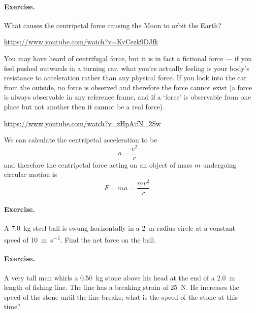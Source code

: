 \documentclass[a4paper]{amsbook}
\begin{document}
\paragraph{Exercise.} What causes the centripetal force causing the Moon to orbit the Earth?

\begin{center}
\begin{tcolorbox}[width=0.8\textwidth,colback={red},title={\textbf{Go and watch...}},colbacktitle=yellow,coltitle=blue]
  \textcolor{white}{\url{https://www.youtube.com/watch?v=KvCezk9DJfk}}
\end{tcolorbox}
\end{center}

You may have heard of centrifugal force, but it is in fact a fictional force --- if you feel pushed outwards in a turning car,
what you're actually feeling is your body's resistance to acceleration rather than any physical force. If you look into
the car from the outside, no force is observed and therefore the force cannot exist (a force is always observable in any
reference frame, and if a `force' is observable from one place but not another then it cannot be a real force).

\begin{center}
\begin{tcolorbox}[width=0.8\textwidth,colback={red},title={\textbf{Go and watch...}},colbacktitle=yellow,coltitle=blue]
  \textcolor{white}{\url{https://www.youtube.com/watch?v=zHpAifN_2Sw}}
\end{tcolorbox}
\end{center}

We can calculate the centripetal acceleration to be
\begin{equation}
  a = \frac{v^2}{r}
\end{equation}
and therefore the centripetal force acting on an object of mass $ m $ undergoing circular motion is
\begin{equation}
  F = ma = \frac{mv^2}{r}.
\end{equation}

\paragraph{Exercise.} A \SI{7.0}{\kilo\gram} steel ball is swung horizontally in a \SI{2}{\metre}-radius circle at
a constant speed of \SI{10}{\metre\per\second}. Find the net force on the ball.

\paragraph{Exercise.} A very tall man whirls a \SI{0.50}{\kilo\gram} stone above his head at the end of
a \SI{2.0}{\metre} length of fishing line. The line has a breaking strain of \SI{25}{\newton}.
He increases the speed of the stone until the line breaks; what is the speed of the stone
at this time?
\end{document}
